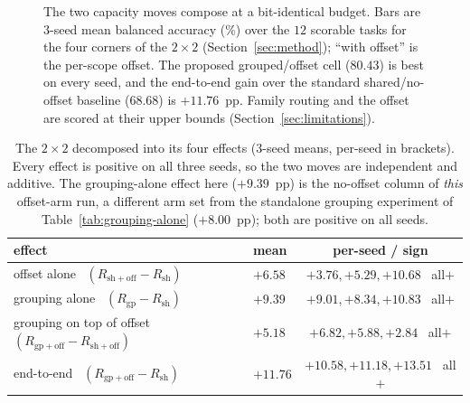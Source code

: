 \begin{figure}[t]
\centering
{}
\caption{The two capacity moves compose at a bit-identical budget. Bars are 3-seed
mean balanced accuracy (\%) over the $12$ scorable tasks for the four corners of the
$2\times2$ (Section~\ref{sec:method}); ``with offset'' is the per-scope offset. The
proposed grouped/offset cell ($80.43$) is best on every seed, and the end-to-end
gain over the standard shared/no-offset baseline ($68.68$) is $\mathbf{+11.76}$~pp.
Family routing and the offset are scored at their upper bounds
(Section~\ref{sec:limitations}).}
\label{fig:combined-2x2}
\end{figure}

\begin{table}[t]
\centering
\small
\caption{The $2\times2$ decomposed into its four effects (3-seed means, per-seed in
brackets). Every effect is positive on all three seeds, so the two moves are
independent and additive. The grouping-alone effect here ($+9.39$~pp) is the
no-offset column of \emph{this} offset-arm run, a different arm set from the
standalone grouping experiment of Table~\ref{tab:grouping-alone} ($+8.00$~pp); both
are positive on all seeds.}
\label{tab:combined-effects}
\begin{tabular}{llc}
\toprule
effect & mean & per-seed / sign \\
\midrule
offset alone \ $(R_{\mathrm{sh{+}off}}-R_{\mathrm{sh}})$      & $+6.58$ & $+3.76,+5.29,+10.68$ \ all$+$ \\
grouping alone \ $(R_{\mathrm{gp}}-R_{\mathrm{sh}})$          & $+9.39$ & $+9.01,+8.34,+10.83$ \ all$+$ \\
grouping on top of offset \ $(R_{\mathrm{gp{+}off}}-R_{\mathrm{sh{+}off}})$ & $+5.18$ & $+6.82,+5.88,+2.84$ \ all$+$ \\
end-to-end \ $(R_{\mathrm{gp{+}off}}-R_{\mathrm{sh}})$        & $\mathbf{+11.76}$ & $+10.58,+11.18,+13.51$ \ all$+$ \\
\bottomrule
\end{tabular}
\end{table}


